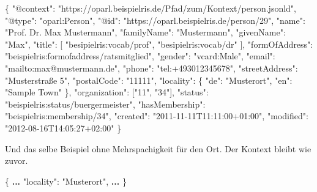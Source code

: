 \documentclass[,a4paper]{article}
\newenvironment{Shaded}{}{}
\newcommand{\DataTypeTok}[1]{\textcolor[rgb]{0.56,0.13,0.00}{{#1}}}
\newcommand{\StringTok}[1]{\textcolor[rgb]{0.25,0.44,0.63}{{#1}}}
\newcommand{\OtherTok}[1]{\textcolor[rgb]{0.00,0.44,0.13}{{#1}}}
\newcommand{\FunctionTok}[1]{\textcolor[rgb]{0.02,0.16,0.49}{{#1}}}
\newcommand{\ErrorTok}[1]{\textcolor[rgb]{1.00,0.00,0.00}{\textbf{{#1}}}}
\begin{document}
\begin{Shaded}
\begin{Highlighting}[]
\FunctionTok{\{}
    \DataTypeTok{"@context"}\FunctionTok{:} \StringTok{"https://oparl.beispielris.de/Pfad/zum/Kontext/person.jsonld"}\FunctionTok{,}
    \DataTypeTok{"@type"}\FunctionTok{:} \StringTok{"oparl:Person"}\FunctionTok{,}
    \DataTypeTok{"@id"}\FunctionTok{:} \StringTok{"https://oparl.beispielris.de/person/29"}\FunctionTok{,}
    \DataTypeTok{"name"}\FunctionTok{:} \StringTok{"Prof. Dr. Max Mustermann"}\FunctionTok{,}
    \DataTypeTok{"familyName"}\FunctionTok{:} \StringTok{"Mustermann"}\FunctionTok{,}
    \DataTypeTok{"givenName"}\FunctionTok{:} \StringTok{"Max"}\FunctionTok{,}
    \DataTypeTok{"title"}\FunctionTok{:} \OtherTok{[}
        \StringTok{"besipielris:vocab/prof"}\OtherTok{,}
        \StringTok{"besipielris:vocab/dr"}
    \OtherTok{]}\FunctionTok{,}
    \DataTypeTok{"formOfAddress"}\FunctionTok{:} \StringTok{"beispielris:formofaddress/ratsmitglied"}\FunctionTok{,}
    \DataTypeTok{"gender"}\FunctionTok{:} \StringTok{"vcard:Male"}\FunctionTok{,}
    \DataTypeTok{"email"}\FunctionTok{:} \StringTok{"mailto:max@mustermann.de"}\FunctionTok{,}
    \DataTypeTok{"phone"}\FunctionTok{:} \StringTok{"tel:+493012345678"}\FunctionTok{,}
    \DataTypeTok{"streetAddress"}\FunctionTok{:} \StringTok{"Musterstraße 5"}\FunctionTok{,}
    \DataTypeTok{"postalCode"}\FunctionTok{:} \StringTok{"11111"}\FunctionTok{,}
    \DataTypeTok{"locality"}\FunctionTok{:} \FunctionTok{\{}
        \DataTypeTok{"de"}\FunctionTok{:} \StringTok{"Musterort"}\FunctionTok{,}
        \DataTypeTok{"en"}\FunctionTok{:} \StringTok{"Sample Town"}
    \FunctionTok{\},}
    \DataTypeTok{"organization"}\FunctionTok{:} \OtherTok{[}\StringTok{"11"}\OtherTok{,} \StringTok{"34"}\OtherTok{]}\FunctionTok{,}
    \DataTypeTok{"status"}\FunctionTok{:} \StringTok{"beispielris:status/buergermeister"}\FunctionTok{,}
    \DataTypeTok{"hasMembership"}\FunctionTok{:} \StringTok{"beispielris:membership/34"}\FunctionTok{,}
    \DataTypeTok{"created"}\FunctionTok{:} \StringTok{"2011-11-11T11:11:00+01:00"}\FunctionTok{,}
    \DataTypeTok{"modified"}\FunctionTok{:} \StringTok{"2012-08-16T14:05:27+02:00"}
\FunctionTok{\}}
\end{Highlighting}
\end{Shaded}

Und das selbe Beispiel ohne Mehrspachigkeit für den Ort. Der Kontext
bleibt wie zuvor.

\begin{Shaded}
\begin{Highlighting}[]
\FunctionTok{\{}
    \ErrorTok{...}
    \DataTypeTok{"locality"}\FunctionTok{:} \StringTok{"Musterort"}\FunctionTok{,}
    \ErrorTok{...}
\FunctionTok{\}}
\end{Highlighting}
\end{Shaded}
\end{document}
